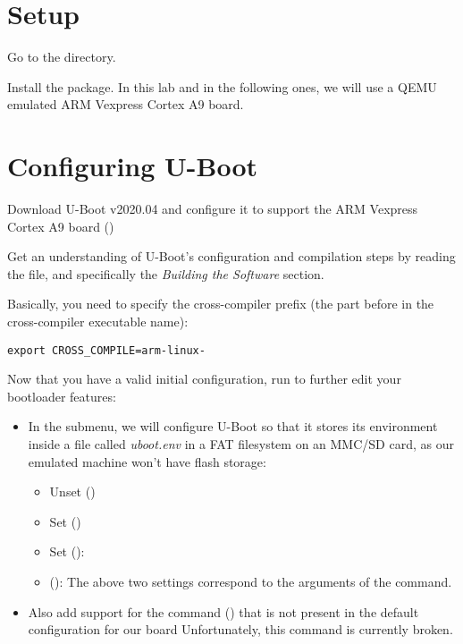 
\section{Setup}

Go to the  directory.

Install the  package. In this lab and in the
following ones, we will use a QEMU emulated ARM Vexpress Cortex A9 board.

\section{Configuring U-Boot}

Download U-Boot v2020.04 and configure it
to support the ARM Vexpress Cortex A9 board
()

Get an understanding of U-Boot's configuration and compilation steps
by reading the  file, and specifically the {\em Building
the Software} section.

Basically, you need to specify the cross-compiler prefix
(the part before  in the cross-compiler executable name):
\begin{verbatim}
export CROSS_COMPILE=arm-linux-
\end{verbatim}

Now that you have a valid initial configuration, run 
to further edit your bootloader features:

\begin{itemize}
\item In the  submenu, we will configure U-Boot so
    that it stores its environment inside a file called {\em
    uboot.env} in a FAT filesystem on an MMC/SD card, as our emulated
    machine won't have flash storage:
    \begin{itemize}
    \item Unset  ()
    \item Set  ()
    \item Set  (): 
    \item {} (): \newline
        The above two settings correspond to the arguments of the
         command.
    \end{itemize}
  \item Also add support for the  command ()
    that is not present in the default configuration for our board
    Unfortunately, this command is currently broken.
\end{itemize}

